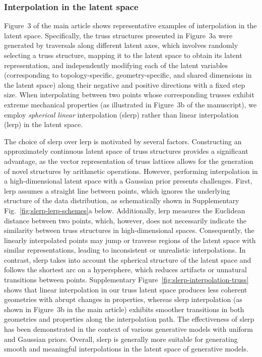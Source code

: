 \documentclass[fleqn,10pt]{wlscirep}
\begin{document}
\subsubsection{Interpolation in the latent space}
\label{subsubsec:SI-itp-latent-space}
Figure~3 of the main article shows representative examples of interpolation in the latent space. Specifically, the truss structures presented in Figure~3a were generated by traversals along different latent axes, which involves randomly selecting a truss structure, mapping it to the latent space to obtain its latent representation, and independently modifying each of the latent variables (corresponding to topology-specific, geometry-specific, and shared dimensions in the latent space) along their negative and positive directions with a fixed step size.  When interpolating between two points whose corresponding trusses exhibit extreme mechanical properties (as illustrated in Figure~3b of the manuscript), we employ \textit{spherical linear} interpolation (slerp) rather than linear interpolation (lerp) in the latent space. 

The choice of slerp over lerp is motivated by several factors. Constructing an approximately continuous latent space of truss structures provides a significant advantage, as the vector representation of truss lattices allows for the generation of novel structures by arithmetic operations. However, performing interpolation in a high-dimensional latent space with a Gaussian prior presents challenges. First, lerp assumes a straight line between points, which ignores the underlying structure of the data distribution, as schematically shown in Supplementary Fig.~\ref{fig:slerp-lerp-schemes}a below. Additionally, lerp measures the Euclidean distance between two points, which, however, does not necessarily indicate the similarity between truss structures in high-dimensional spaces. Consequently, the linearly interpolated points may jump or traverse regions of the latent space with similar representations, leading to inconsistent or unrealistic interpolations. In contrast, slerp takes into account the spherical structure of the latent space and follows the shortest arc on a hypersphere, which reduces artifacts or unnatural transitions between points. Supplementary Figure~\ref{fig:slerp-interpolation-truss} shows that linear interpolation in our truss latent space produces less coherent geometries with abrupt changes in properties, whereas slerp interpolation (as shown in Figure~3b in the main article) exhibits smoother transitions in both geometries and properties along the interpolation path. The effectiveness of slerp has been demonstrated in the context of various generative models \cite{gomez2018automatic, white2016sampling} with uniform and Gaussian priors. Overall, slerp is generally more suitable for generating smooth and meaningful interpolations in the latent space of generative models.
\end{document}
